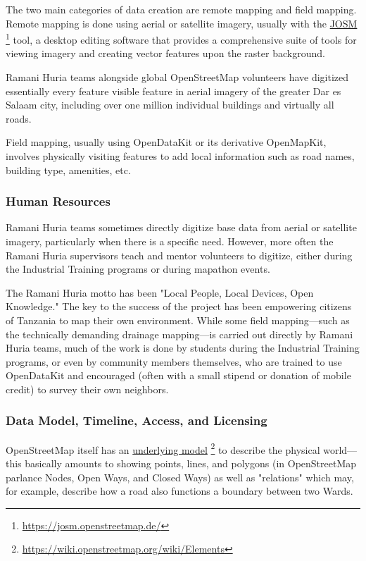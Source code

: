 \documentclass[a4paper,12pt,twoside]{article}
\begin{document}
The two main categories of data creation are remote mapping and field mapping. Remote mapping is done using aerial or satellite imagery, usually with the \href{https://josm.openstreetmap.de/}{JOSM} \footnote{\url{https://josm.openstreetmap.de/}} tool, a desktop editing software that provides a comprehensive suite of tools for viewing imagery and creating vector features upon the raster background.

Ramani Huria teams alongside global OpenStreetMap volunteers have digitized essentially every feature visible feature in aerial imagery of the greater Dar es Salaam city, including over one million individual buildings and virtually all roads. 

Field mapping, usually using OpenDataKit or its derivative OpenMapKit, involves physically visiting features to add local information such as road names, building type, amenities, etc. 

\subsubsection{Human Resources}
Ramani Huria teams sometimes directly digitize base data from aerial or satellite imagery, particularly when there is a specific need. However, more often the Ramani Huria supervisors teach and mentor volunteers to digitize, either during the Industrial Training programs or during mapathon events. 

The Ramani Huria motto has been "Local People, Local Devices, Open Knowledge." The key to the success of the project has been empowering citizens of Tanzania to map their own environment. While some field mapping---such as the technically demanding drainage mapping---is carried out directly by Ramani Huria teams, much of the work is done by students during the Industrial Training programs, or even by community members themselves, who are trained to use OpenDataKit and encouraged (often with a small stipend or donation of mobile credit) to survey their own neighbors.

\subsubsection{Data Model, Timeline, Access, and Licensing}
OpenStreetMap itself has an \href{https://wiki.openstreetmap.org/wiki/Elements}{underlying model} \footnote{\url{https://wiki.openstreetmap.org/wiki/Elements}} to describe the physical world---this basically amounts to showing points, lines, and polygons (in OpenStreetMap parlance Nodes, Open Ways, and Closed Ways) as well as "relations" which may, for example, describe how a road also functions a boundary between two Wards.
\end{document}
